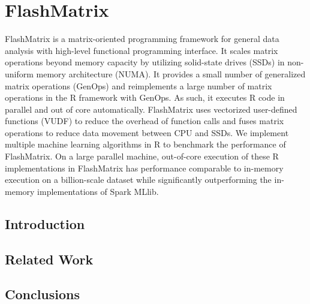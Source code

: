 \chapter{FlashMatrix}
\label{sec:fm}
\chaptermark{}

FlashMatrix is a matrix-oriented programming framework for general data analysis
with high-level functional programming interface. It scales matrix operations
beyond memory capacity by utilizing solid-state drives (SSDs) in non-uniform
memory architecture (NUMA). It provides a small number of generalized matrix
operations (GenOps) and reimplements a large number of matrix operations in
the R framework with GenOps. As such, it executes R code in parallel and out of
core automatically. FlashMatrix
uses vectorized user-defined functions (VUDF) to reduce the overhead of function
calls and fuses matrix operations to reduce data movement between CPU and
SSDs. We implement multiple machine learning algorithms in R to benchmark
the performance of FlashMatrix. On a large parallel machine, out-of-core
execution of these R implementations in FlashMatrix has performance comparable
to in-memory execution on a billion-scale dataset while significantly
outperforming the in-memory implementations of Spark MLlib.

\section{Introduction}


\section{Related Work}






\section{Conclusions}

